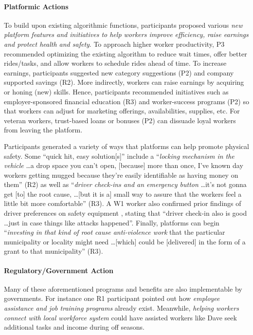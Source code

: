 \paragraph{Platformic Actions}
To build upon existing algorithmic functions, participants proposed various \textit{new platform features and initiatives to help workers improve efficiency, raise earnings and protect health and safety}.
To approach higher worker productivity, P3 recommended optimizing the existing algorithm to reduce wait times, offer better rides/tasks, and allow workers to schedule rides ahead of time. 
To increase earnings, participants suggested new category suggestions (P2) and company supported savings (R2).
More indirectly, workers can raise earnings by acquiring or honing (new) skills. Hence, participants recommended initiatives such as employer-sponsored financial education (R3) and worker-success programs (P2) so that workers can adjust for marketing offerings, availabilities, supplies, etc. For veteran workers, trust-based loans or bonuses (P2) can dissuade loyal workers from leaving the platform. 

Participants generated a variety of ways that platforms can help promote physical safety. Some ``quick hit, easy solution[s]'' include a ``\textit{locking mechanism in the vehicle} \dots a drop space you can't open, [because] more than once, I've known day workers getting mugged because they're easily identifiable as having money on them'' (R2) as well as  ``\textit{driver check-ins and an emergency button} \dots it's not gonna get [to] the root cause, \dots [but it is a] small way to assure that the workers feel a little bit more comfortable'' (R3). A W1 worker also confirmed  prior findings of driver preferences on safety equipment \cite{Almoqbel2019-in}, stating that ``driver check-in also is good  \dots just in case things like attacks happened''. Finally, platforms can begin ``\textit{investing in that kind of root cause anti-violence work} that the particular municipality or locality might need \dots [which] could be [delivered] in the form of a grant to that municipality'' (R3). 

\paragraph{Regulatory/Government Action}
Many of these aforementioned programs and benefits are also implementable by governments. For instance one R1 participant pointed out how \textit{employee assistance and job training programs} already exist. Meanwhile, \textit{helping workers connect with local workforce system} could have assisted workers like Dave seek additional tasks and income during off seasons.

